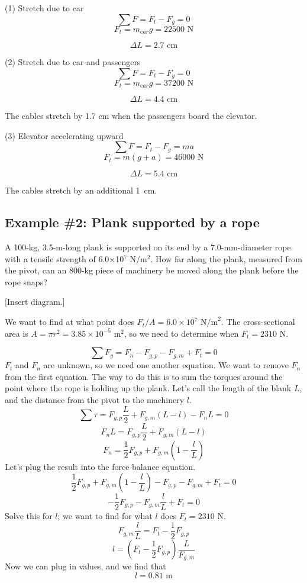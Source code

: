 (1) Stretch due to car
$$\sum F = F_t - F_g = 0$$
$$F_t = m_{\mathrm car}g = 22500\mbox{ N}$$

$$\boxed{\Delta L = 2.7\mbox{ cm}}$$

(2) Stretch due to car and passengers
$$\sum F = F_t - F_g = 0$$
$$F_t = m_{\mathrm car}g = 37200\mbox{ N}$$

$$\boxed{\Delta L = 4.4\mbox{ cm}}$$

The cables stretch by 1.7 cm when the passengers board the elevator.

(3) Elevator accelerating upward
$$\sum F = F_t - F_g = ma$$
$$F_t = m(g+a) = 46000\mbox{ N}$$

$$\boxed{\Delta L = 5.4\mbox{ cm}}$$

The cables stretch by an additional 1~cm.


\subsection{Example \#2: Plank supported by a rope}
A 100-kg, 3.5-m-long plank is supported on its end by a 7.0-mm-diameter rope with a tensile strength of 6.0$\times$10$^7$ N/m$^2$. How far along the plank, measured from the pivot, can an 800-kg piece of machinery be moved along the plank before the rope snaps?

[Insert diagram.]
\vspace{5cm}

We want to find at what point does $F_t/A=6.0\times 10^7\mbox{ N/m}^2$. The cross-sectional area is $A=\pi r^2=3.85\times 10^{-5}\mbox{ m}^2$, so we need to determine when $F_t=2310\mbox{ N}$.

$$\sum F_y=F_n-F_{g,p}-F_{g,m}+F_t=0$$
$F_t$ and $F_n$ are unknown, so we need one another equation. We want to remove $F_n$ from the first equation. The way to do this is to sum the torques around the point where the rope is holding up the plank. Let's call the length of the blank $L$, and the distance from the pivot to the machinery $l$.
$$\sum \tau=F_{g,p}\frac{L}{2}+F_{g,m}(L-l)-F_nL=0$$
$$F_nL=F_{g,p}\frac{L}{2}+F_{g,m}(L-l)$$
$$F_n=\frac{1}{2}F_{g,p}+F_{g,m}\left(1-\frac{l}{L}\right)$$
Let's plug the result into the force balance equation.
$$\frac{1}{2}F_{g,p}+F_{g,m}\left(1-\frac{l}{L}\right)-F_{g,p}-F_{g,m}+F_t=0$$
$$-\frac{1}{2}F_{g,p}-F_{g,m}\frac{l}{L}+F_t=0$$
Solve this for $l$; we want to find for what $l$ does $F_t=2310\mbox{ N}$.
$$F_{g,m}\frac{l}{L}=F_t-\frac{1}{2}F_{g,p}$$
$$l=\left(F_t-\frac{1}{2}F_{g,p}\right)\frac{L}{F_{g,m}}$$
Now we can plug in values, and we find that
$$\boxed{l=0.81\mbox{ m}}$$

\clearpage

